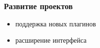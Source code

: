 \documentclass[unicode]{beamer}
\begin{document}
\begin{frame}
\frametitle {Развитие проектов}
\begin{itemize}
\item поддержка новых плагинов
\item расширение интерфейса
\end{itemize}
\end{frame}


 
\end{document}
